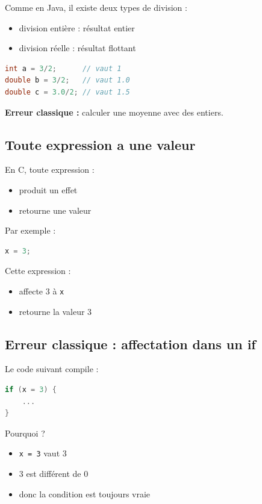 Comme en Java, il existe deux types de division :

\begin{itemize}
    \item division entière : résultat entier
    \item division réelle : résultat flottant
\end{itemize}

\begin{lstlisting}[language=C]
int a = 3/2;      // vaut 1
double b = 3/2;   // vaut 1.0
double c = 3.0/2; // vaut 1.5
\end{lstlisting}

\textbf{Erreur classique :} calculer une moyenne avec des entiers.

\subsection{Toute expression a une valeur}

En C, toute expression :

\begin{itemize}
    \item produit un effet
    \item retourne une valeur
\end{itemize}

Par exemple :

\begin{lstlisting}[language=C]
x = 3;
\end{lstlisting}

Cette expression :

\begin{itemize}
    \item affecte 3 à \texttt{x}
    \item retourne la valeur 3
\end{itemize}

\subsection{Erreur classique : affectation dans un if}

Le code suivant compile :

\begin{lstlisting}[language=C]
if (x = 3) {
    ...
}
\end{lstlisting}

Pourquoi ?

\begin{itemize}
    \item \texttt{x = 3} vaut 3
    \item 3 est différent de 0
    \item donc la condition est toujours vraie
\end{itemize}


